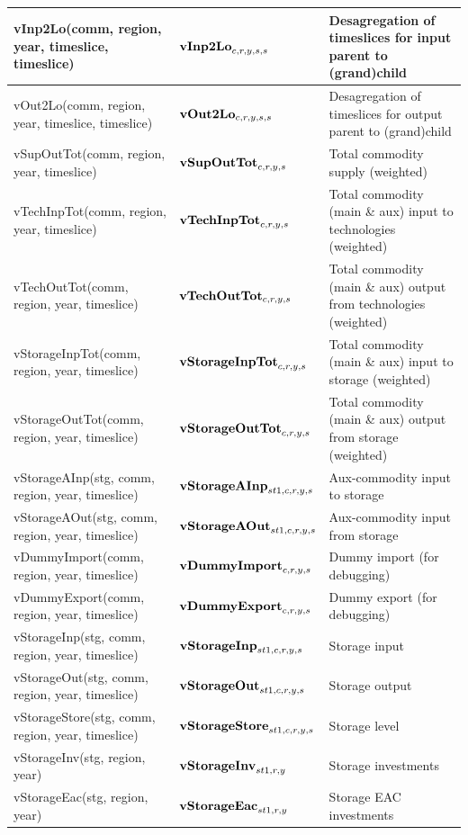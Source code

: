 \documentclass{article}
\begin{document}
\begin{longtable}{|p{10cm}|p{5cm}|p{9cm}|}
 \hline
vInp2Lo(comm, region, year, timeslice, timeslice) & ${\bf vInp2Lo}_{c,r,y,s,s}$ & Desagregation of timeslices for input parent to (grand)child \\
 \hline
vOut2Lo(comm, region, year, timeslice, timeslice) & ${\bf vOut2Lo}_{c,r,y,s,s}$ & Desagregation of timeslices for output parent to (grand)child \\
 \hline
vSupOutTot(comm, region, year, timeslice) & ${\bf vSupOutTot}_{c,r,y,s}$ & Total commodity supply (weighted) \\
 \hline
vTechInpTot(comm, region, year, timeslice) & ${\bf vTechInpTot}_{c,r,y,s}$ & Total commodity (main \& aux) input to technologies (weighted) \\
 \hline
vTechOutTot(comm, region, year, timeslice) & ${\bf vTechOutTot}_{c,r,y,s}$ & Total commodity (main \& aux) output from technologies (weighted) \\
 \hline
vStorageInpTot(comm, region, year, timeslice) & ${\bf vStorageInpTot}_{c,r,y,s}$ & Total commodity (main \& aux) input to storage (weighted) \\
 \hline
vStorageOutTot(comm, region, year, timeslice) & ${\bf vStorageOutTot}_{c,r,y,s}$ & Total commodity (main \& aux) output from storage (weighted) \\
 \hline
vStorageAInp(stg, comm, region, year, timeslice) & ${\bf vStorageAInp}_{st1,c,r,y,s}$ & Aux-commodity input to storage \\
 \hline
vStorageAOut(stg, comm, region, year, timeslice) & ${\bf vStorageAOut}_{st1,c,r,y,s}$ & Aux-commodity input from storage \\
 \hline
vDummyImport(comm, region, year, timeslice) & ${\bf vDummyImport}_{c,r,y,s}$ & Dummy import (for debugging) \\
 \hline
vDummyExport(comm, region, year, timeslice) & ${\bf vDummyExport}_{c,r,y,s}$ & Dummy export (for debugging) \\
 \hline
vStorageInp(stg, comm, region, year, timeslice) & ${\bf vStorageInp}_{st1,c,r,y,s}$ & Storage input \\
 \hline
vStorageOut(stg, comm, region, year, timeslice) & ${\bf vStorageOut}_{st1,c,r,y,s}$ & Storage output \\
 \hline
vStorageStore(stg, comm, region, year, timeslice) & ${\bf vStorageStore}_{st1,c,r,y,s}$ & Storage level \\
 \hline
vStorageInv(stg, region, year) & ${\bf vStorageInv}_{st1,r,y}$ & Storage investments \\
 \hline
vStorageEac(stg, region, year) & ${\bf vStorageEac}_{st1,r,y}$ & Storage EAC investments \\

\end{longtable}
\end{document}

